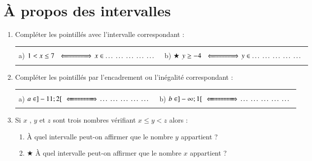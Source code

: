 \documentclass[oneside,12pt]{exam}          %
\begin{document}
\section{À propos des intervalles}
\begin{enumerate}[itemsep = 2mm]
	\item Compléter les pointillés avec l'intervalle correspondant : \\
	
	\begin{tabular}{p{} p{}}
		a) $1 < x \leq 7 \, \ssi{15mm}\,  x \in \ldots\ldots\ldots\ldots\ldots$ &
		b) $\bigstar$ $y \geq -4 \, \ssi{15mm}\,  y \in \ldots\ldots\ldots\ldots\ldots$ 
	\end{tabular}
	
	\item Compléter les pointillés par l'encadrement ou l'inégalité correspondant  : \\

	\begin{tabular}{p{} p{}}
		a) $a \in ]-11 ; 2[ \, \ssi{15mm}\, \ldots\ldots\ldots\ldots\ldots$ &
		b) $b \in ]-\infty ; 1[ \, \ssi{15mm}\, \ldots\ldots\ldots\ldots\ldots$
	\end{tabular}
	
	\item Si $x$ , $y$ et $z$ sont trois nombres vérifiant $x \leq y < z$ alors :
	\begin{enumerate}
		\item À quel intervalle peut-on affirmer que le nombre $y$ appartient ?
		\item $\bigstar$ À quel intervalle peut-on affirmer que le nombre $x$ appartient ?
	\end{enumerate}
\end{enumerate}
\end{document}
